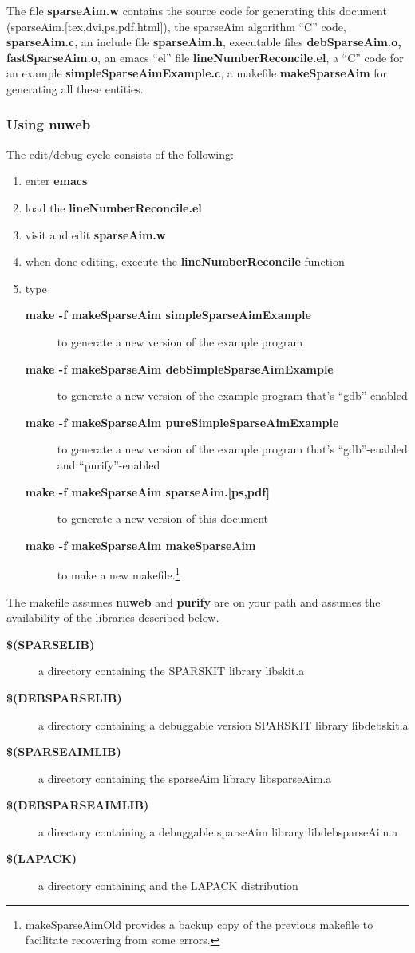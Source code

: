 \documentclass{article}
\begin{document}
The file {\bf sparseAim.w} contains the source code for generating
this document (sparseAim.[tex,dvi,ps,pdf,html]), the sparseAim algorithm
``C'' code, {\bf sparseAim.c}, an include file {\bf sparseAim.h},
 executable files {\bf debSparseAim.o, fastSparseAim.o}, an emacs ``el'' file {\bf lineNumberReconcile.el}, a ``C'' code 
for an example {\bf simpleSparseAimExample.c}, a makefile {\bf makeSparseAim}
for generating all these entities.
\subsubsection{Using nuweb}
\label{sec:nuweb}

The edit/debug cycle consists of the following:
\begin{enumerate}
\item enter {\bf emacs }
\item load the {\bf lineNumberReconcile.el}
\item visit and edit {\bf sparseAim.w}
\item when done editing, execute the {\bf lineNumberReconcile} function
\item type 
  \begin{description}
  \item[{\bf make -f makeSparseAim simpleSparseAimExample}] to generate 
a new version of the example program 
  \item[{\bf make -f makeSparseAim debSimpleSparseAimExample}] to generate 
a new version of the example program that's ``gdb''-enabled
  \item[{\bf make -f makeSparseAim pureSimpleSparseAimExample}] to generate 
a new version of the example program that's ``gdb''-enabled and ``purify''-enabled
\item[{\bf make -f makeSparseAim sparseAim.[ps,pdf]}] to generate a new version of this document 
\item[{\bf make -f makeSparseAim makeSparseAim}] to make a new makefile.\footnote{makeSparseAimOld provides a backup copy of the previous makefile to facilitate recovering from some errors.}
  \end{description}
\end{enumerate}

The makefile assumes {\bf nuweb} and {\bf purify} are on your path and assumes the availability of the libraries described below.
\begin{description}
\item[{\bf \$(SPARSELIB)}] a directory containing the SPARSKIT library libskit.a
\item[{\bf \$(DEBSPARSELIB)}] a directory containing a debuggable
version  SPARSKIT library libdebskit.a
\item[{\bf \$(SPARSEAIMLIB)}] a directory containing the sparseAim library libsparseAim.a
\item[{\bf \$(DEBSPARSEAIMLIB)}] a directory containing a debuggable sparseAim library libdebsparseAim.a
\item[{\bf \$(LAPACK)}] a directory containing and the LAPACK distribution
\end{description}
\end{document}
